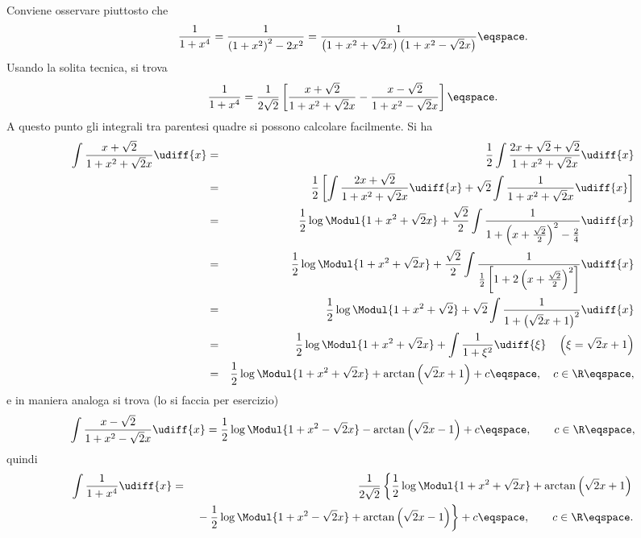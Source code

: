 \begin{Solution}
Conviene osservare piuttosto che
\begin{displaymath}
\frac{1}{1+x^{4}} = \frac{1}{\left( 1 + x^{2} \right)^{2} - 2x^{2}} =
\frac{1}{\left( 1 + x^{2}  + \sqrt{2} x\right) \left( 1+x^{2} - \sqrt{2}
x\right)} \eqspace .
\end{displaymath}
Usando la solita tecnica, si trova
\begin{displaymath}
\frac{1}{1+x^{4}} = \frac{1}{2\sqrt{2}} \left[ \frac{x+\sqrt{2}}{1 + x^{2}
+\sqrt{2} x } - \frac{ x - \sqrt{2}}{1+x^{2} - \sqrt{2} x} \right]  \eqspace .
\end{displaymath}
A questo punto gli integrali tra parentesi quadre si possono calcolare
facilmente.
 Si ha
\begin{eqnarray*}
\int \frac{x+\sqrt{2}}{1+x^{2} + \sqrt{2} x} \udiff{x} &=&
\frac{1}{2} \int\frac{2 x + \sqrt{2} + \sqrt{2}}{1+x^{2} + \sqrt{2} x} \udiff{x}
\\
&=& \frac{1}{2} \left[ \int \frac{ 2x + \sqrt{2}}{1+x^2 + \sqrt{2} x} \udiff{x}
+ \sqrt{2} \int\frac{1}{1+x^{2} + \sqrt{2} x} \udiff{x} \right] \\
&=& \frac{1}{2} \log \Modul{1+x^{2} + \sqrt{2} x } + \frac{\sqrt{2}}{2} \int
\frac{1}{1+ \left( x + \frac{\sqrt{2}}{2} \right)^{2} - \frac{2}{4}} \udiff{x}
\\
&=& \frac{1}{2} \log \Modul{1+x^{2} + \sqrt{2} x} + \frac{\sqrt{2}}{2} \int
\frac{1}{\frac{1}{2} \left[ 1 + 2 \left( x + \frac{\sqrt{2}}{2} \right)^{2}\right]}
\udiff{x} \\
&=&\frac{1}{2} \log \Modul{1+ x^{2} + \sqrt{2}} + \sqrt{2} \int \frac{1}{1 +
\left( \sqrt{2} x + 1\right)^{2}} \udiff{x} \\
&=& \frac{1}{2} \log \Modul{1+x^{2} + \sqrt{2} x} + \int \frac{1}{1+\xi^{2}}
\udiff{\xi} \quad \left( \xi = \sqrt{2} x +1 \right) \\
&=& \frac{1}{2} \log \Modul{1+x^{2}+\sqrt{2} x } + \arctan \left( \sqrt{2} x +1
\right) + c \eqspace, \quad c \in \R \eqspace ,
\end{eqnarray*}
e in maniera analoga  si trova (lo si faccia per esercizio)
\begin{displaymath}
\int  \frac{x - \sqrt{2}}{1+x^{2}-\sqrt{2} x} \udiff{x} = \frac{1}{2} \log
\Modul{1+x^{2} - \sqrt{2} x} - \arctan \left( \sqrt{2} x - 1\right) + c
\eqspace, \qquad c \in \R\eqspace ,
\end{displaymath}
quindi
\begin{eqnarray*}
\int \frac{1}{1+x^{4}} \udiff{x} &=& \frac{1}{2\sqrt{2}} \left\{ \frac{1}{2} \log
\Modul{1+x^{2} + \sqrt{2} x} + \arctan \left( \sqrt{2} x + 1\right) \right. \\
&& \left. {} - \frac{1}{2} \log \Modul{ 1+x^{2} -\sqrt{2} x} + \arctan \left( \sqrt{2}
x -1\right) \right\} + c \eqspace, \qquad c \in\R \eqspace .
\end{eqnarray*}
\end{Solution}
